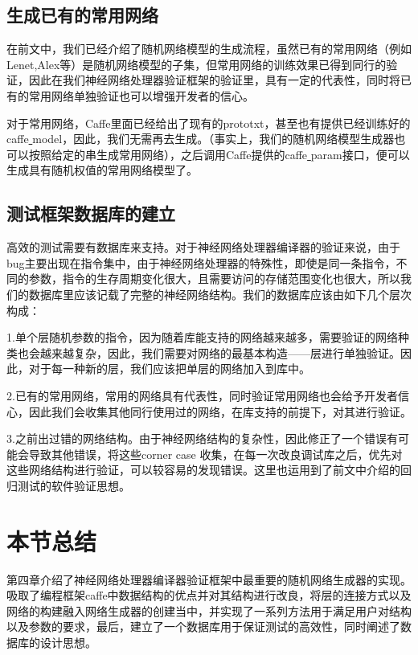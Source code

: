 \subsection{生成已有的常用网络}
在前文中，我们已经介绍了随机网络模型的生成流程，虽然已有的常用网络（例如Lenet,Alex等）是随机网络模型的子集，但常用网络的训练效果已得到同行的验证，因此在我们神经网络处理器验证框架的验证里，具有一定的代表性，同时将已有的常用网络单独验证也可以增强开发者的信心。

对于常用网络，Caffe里面已经给出了现有的prototxt，甚至也有提供已经训练好的caffe\underline{ }model，因此，我们无需再去生成。（事实上，我们的随机网络模型生成器也可以按照给定的串生成常用网络），之后调用Caffe提供的caffe\underline{ }param接口，便可以生成具有随机权值的常用网络模型了。

\subsection{测试框架数据库的建立}
高效的测试需要有数据库来支持。对于神经网络处理器编译器的验证来说，由于bug主要出现在指令集中，由于神经网络处理器的特殊性，即使是同一条指令，不同的参数，指令的生存周期变化很大，且需要访问的存储范围变化也很大，所以我们的数据库里应该记载了完整的神经网络结构。我们的数据库应该由如下几个层次构成：

1.单个层随机参数的指令，因为随着库能支持的网络越来越多，需要验证的网络种类也会越来越复杂，因此，我们需要对网络的最基本构造——层进行单独验证。因此，对于每一种新的层，我们应该把单层的网络加入到库中。

2.已有的常用网络，常用的网络具有代表性，同时验证常用网络也会给予开发者信心，因此我们会收集其他同行使用过的网络，在库支持的前提下，对其进行验证。

3.之前出过错的网络结构。由于神经网络结构的复杂性，因此修正了一个错误有可能会导致其他错误，将这些corner case 收集，在每一次改良调试库之后，优先对这些网络结构进行验证，可以较容易的发现错误。这里也运用到了前文中介绍的回归测试的软件验证思想。
\section{本节总结}
第四章介绍了神经网络处理器编译器验证框架中最重要的随机网络生成器的实现。吸取了编程框架caffe中数据结构的优点并对其结构进行改良，将层的连接方式以及网络的构建融入网络生成器的创建当中，并实现了一系列方法用于满足用户对结构以及参数的要求，最后，建立了一个数据库用于保证测试的高效性，同时阐述了数据库的设计思想。